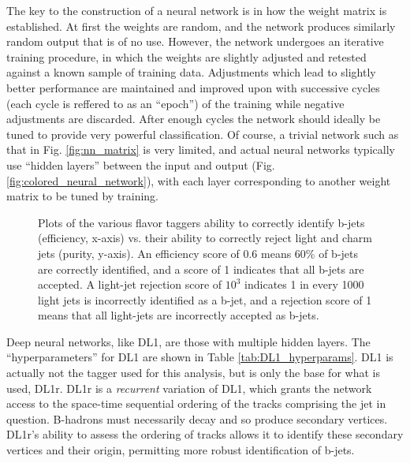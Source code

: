             The key to the construction of a neural network is in how the weight matrix is established.
            At first the weights are random, and the network produces similarly random output that is of no use.
            However, the network undergoes an iterative training procedure, in which the weights are slightly adjusted
                and retested against a known sample of training data.
            Adjustments which lead to slightly better performance are maintained and improved upon
                with successive cycles (each cycle is reffered to as an ``epoch'')
                of the training while negative adjustments are discarded.
            After enough cycles the network should ideally be tuned to provide very powerful classification.
            Of course, a trivial network such as that in Fig. \ref{fig:nn_matrix} is very limited,
                and actual neural networks typically use ``hidden layers'' between the input and output (Fig. \ref{fig:colored_neural_network}),
                with each layer corresponding to another weight matrix to be tuned by training.

            \begin{figure}
                \caption{
                    Plots of the various flavor taggers ability to correctly identify b-jets (efficiency, x-axis)
                        vs. their ability to correctly reject light and charm jets (purity, y-axis).
                    An efficiency score of 0.6 means 60\% of b-jets are correctly identified,
                        and a score of 1 indicates that all b-jets are accepted.
                    A light-jet rejection score of $10^3$ indicates 1 in every 1000 light jets is incorrectly identified as a b-jet,
                        and a rejection score of 1 means that all light-jets are incorrectly accepted as b-jets\cite{bjet_id_and_performance}.
                }
                \label{fig:ip3d_perf}
            \end{figure}


            Deep neural networks, like DL1, are those with multiple hidden layers.
            The ``hyperparameters'' for DL1 are shown in Table \ref{tab:DL1_hyperparams}.
            DL1 is actually not the tagger used for this analysis, but is only the base for what is used, DL1r.
            DL1r is a \textit{recurrent} variation of DL1, which grants the network access to the space-time sequential
                ordering of the tracks comprising the jet in question.
            B-hadrons must necessarily decay and so produce secondary vertices.
            DL1r's ability to assess the ordering of tracks allows it to identify these secondary vertices and their origin,
                permitting more robust identification of b-jets.

